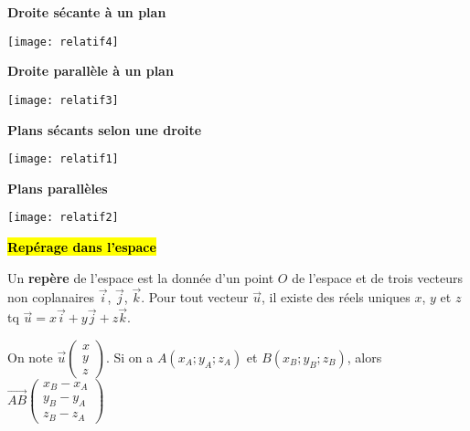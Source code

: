 \documentclass[10pt,fleqn, openany, landscape, twocolumn]{book} %
\begin{document}
\begin{minipage}{0.23\linewidth}\begin{center}
\textbf{Droite sécante à un plan}
\end{center}
\begin{center}
\texttt{[image: relatif4]}
\end{center}
\end{minipage}\hfill \begin{minipage}{0.23\linewidth}\begin{center}
\textbf{Droite parallèle à un plan}
\end{center}
\begin{center}
\texttt{[image: relatif3]}
\end{center}
\end{minipage}\hfill \begin{minipage}{0.23\linewidth}\begin{center}
\textbf{Plans sécants selon une droite}
\end{center}
\begin{center}
\texttt{[image: relatif1]}
\end{center}
\end{minipage}\hfill \begin{minipage}{0.23\linewidth}\begin{center}
\textbf{Plans parallèles}
\end{center}
\begin{center}
\texttt{[image: relatif2]}
\end{center}\end{minipage}

\hl{\textbf{Repérage dans l'espace}}

Un \textbf{repère} de l'espace est la donnée d'un point $O$ de l'espace et de trois vecteurs non coplanaires $\vec i$, $\vec j$, $\vec k$.
\renewcommand{\arraystretch}{1}
Pour tout vecteur $\vec u$, il existe des réels uniques $x$, $y$ et $z$ tq $\vec u=x\vec i + y \vec j + z \vec k$. 

On note $\vec u \begin{pmatrix}x\\y\\z\end{pmatrix}$. Si on a $A(x_A ; y_A ; z_A)$ et $B(x_B ; y_B ; z_B)$, alors $\overrightarrow{AB}\begin{pmatrix}x_B-x_A\\y_B-y_A\\z_B-z_A\end{pmatrix}$
\end{document}
